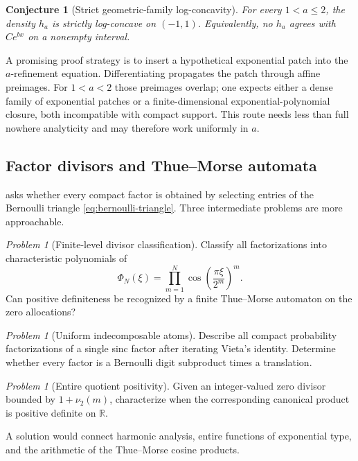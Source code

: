 \documentclass[11pt,oneside]{article}
\newtheorem{conjecture}[theorem]{Conjecture}
\theoremstyle{definition}
\theoremstyle{remark}
\newcommand{\R}{\mathbb R}
\newtheorem{problem}[theorem]{Problem}
\begin{document}
\begin{conjecture}[Strict geometric-family log-concavity]\label{conj:strict-a}
For every $1<a\le2$, the density $h_a$ is strictly log-concave on $(-1,1)$.
Equivalently, no $h_a$ agrees with $Ce^{bx}$ on a nonempty interval.
\end{conjecture}

A promising proof strategy is to insert a hypothetical exponential patch into the
$a$-refinement equation.  Differentiating propagates the patch through affine
preimages.  For $1<a<2$ those preimages overlap; one expects either a dense family
of exponential patches or a finite-dimensional exponential-polynomial closure,
both incompatible with compact support.  This route needs less than full nowhere
analyticity and may therefore work uniformly in $a$.

\subsection{Factor divisors and Thue--Morse automata}
 asks whether every compact factor is obtained by
selecting entries of the Bernoulli triangle \eqref{eq:bernoulli-triangle}.  Three
intermediate problems are more approachable.

\begin{problem}[Finite-level divisor classification]
Classify all factorizations into characteristic polynomials of
\[
 \Phi_N(\xi)=\prod_{m=1}^{N}\cos\!\left(\frac{\pi\xi}{2^m}\right)^m.
\]
Can positive definiteness be recognized by a finite Thue--Morse automaton on the
zero allocations?
\end{problem}

\begin{problem}[Uniform indecomposable atoms]
Describe all compact probability factorizations of a single sinc factor after
iterating Vieta's identity.  Determine whether every factor is a Bernoulli digit
subproduct times a translation.
\end{problem}

\begin{problem}[Entire quotient positivity]
Given an integer-valued zero divisor bounded by $1+\nu_2(m)$, characterize when
the corresponding canonical product is positive definite on $\R$.
\end{problem}

A solution would connect harmonic analysis, entire functions of exponential type,
and the arithmetic of the Thue--Morse cosine products.
\end{document}
